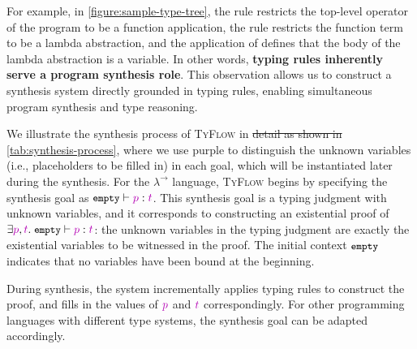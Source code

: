 \documentclass[manuscript,screen]{acmart}
\makeatletter
\newcommand{\stlctype}[3]{{#1} \vdash {#2} : {#3}}
\newcommand{\sk}[1]{\textcolor{skunknown}{#1}}
\newcommand{\toolname}[1]{\textsc{#1}}
\newcommand{\tcode}[1]{{\small \texttt{\spaceskip=0.2em #1}}}
\newcommand{\mainname}{\toolname{TyFlow}\xspace}
\newcommand{\stlc}{\lambda^{\rightarrow}}
\providecommand{\DIFdel}[1]{{\protect\color{red}\sout{#1}}} %
\providecommand{\DIFdelbegin}{} %
\providecommand{\DIFdelend}{} %
\providecommand{\DIFscaledelfig}{0.5}
\newlength{\DIFdelgraphicswidth} %
\newlength{\DIFdelgraphicsheight} %
\providecommand{\DIFdelincludegraphics}[2][]{%
\sbox{\DIFdelgraphicsbox}{\DIFOincludegraphics[#1]{#2}}%
\settoboxwidth{\DIFdelgraphicswidth}{\DIFdelgraphicsbox} %
\settoboxtotalheight{\DIFdelgraphicsheight}{\DIFdelgraphicsbox} %
\scalebox{\DIFscaledelfig}{%
\parbox[b]{\DIFdelgraphicswidth}{\usebox{\DIFdelgraphicsbox}\\[-\baselineskip] \rule{\DIFdelgraphicswidth}{0em}}\llap{\resizebox{\DIFdelgraphicswidth}{\DIFdelgraphicsheight}{%
\setlength{\unitlength}{\DIFdelgraphicswidth}%
\begin{picture}(1,1)%
\thicklines\linethickness{2pt} %
{\color[rgb]{1,0,0}\put(0,0){\framebox(1,1){}}}%
{\color[rgb]{1,0,0}\put(0,0){\line( 1,1){1}}}%
{\color[rgb]{1,0,0}\put(0,1){\line(1,-1){1}}}%
\end{picture}%
}\hspace*{3pt}}} %
} %
\DeclareRobustCommand{\DIFdelbegin}{\DIFOdelbegin \let\includegraphics\DIFdelincludegraphics} %
\DeclareRobustCommand{\DIFdelend}{\DIFOaddend \let\includegraphics\DIFOincludegraphics} %
\let\sout@orig\sout %
\renewcommand{\sout}[1]{\ifmmode\text{\sout@orig{\ensuremath{#1}}}\else\sout@orig{#1}\fi} %
\makeatother
\begin{document}
For example, in \autoref{figure:sample-type-tree}, the  rule restricts the top-level operator of the program to be a function application, the  rule restricts the function term to be a lambda abstraction, and the application of  defines that the body of the lambda abstraction is a variable. 
In other words, \textbf{typing rules inherently serve a program synthesis role}. This observation allows us to construct a synthesis system directly grounded in typing rules, enabling simultaneous program synthesis and type reasoning.

We illustrate the synthesis process of \mainname in \DIFdelbegin \DIFdel{detail as shown in }\DIFdelend \autoref{tab:synthesis-process}, where we use \sk{purple} to distinguish the unknown variables (i.e., placeholders to be filled in) in each goal, which will be instantiated later during the synthesis.
%
For the $\stlc$ language, \mainname begins by specifying the synthesis goal as $\stlctype{\tcode{empty}}{\sk{p}}{\sk{t}}$. This synthesis goal is a typing judgment with unknown variables, and it corresponds to constructing an existential proof of $\exists \sk{p}, \sk{t}.\; \stlctype{\tcode{empty}}{\sk{p}}{\sk{t}}$: the unknown variables in the typing judgment are exactly the existential variables to be witnessed in the proof. The initial context $\tcode{empty}$ indicates that no variables have been bound at the beginning.

During synthesis, the system incrementally applies typing rules to construct the proof, and fills in the values of $\sk{p}$ and $\sk{t}$ correspondingly. For other programming languages with different type systems, the synthesis goal can be adapted accordingly. 
\end{document}
